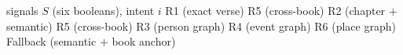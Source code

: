 \begin{algorithm}[!t]
\caption{Signal-driven route selection}
\label{alg:routes}
\begin{algorithmic}[1]
\REQUIRE signals $S$ (six booleans), intent $i$
 \RETURN R1 (exact verse)
  \RETURN R5 (cross-book)
 \RETURN R2 (chapter $+$ semantic)
  \RETURN R5 (cross-book)
 \RETURN R3 (person graph)
 \RETURN R4 (event graph)
 \RETURN R6 (place graph)
\ELSE \RETURN Fallback (semantic $+$ book anchor)
\ENDIF
\end{algorithmic}
\end{algorithm}

